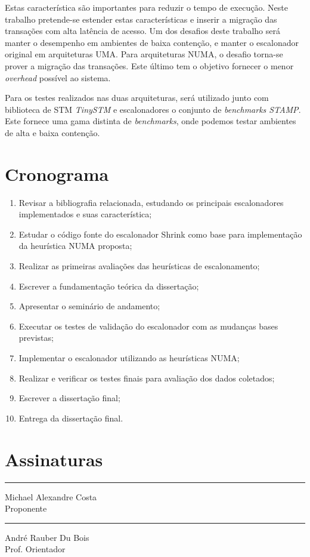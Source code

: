 \documentclass[diss-proposta,nocipinfo]{texufpel}
\begin{document}
Estas característica são importantes para reduzir o tempo de execução. Neste trabalho pretende-se estender estas características e inserir a migração das transações com alta latência de acesso. Um dos desafios deste trabalho será manter o desempenho em ambientes de baixa contenção, e manter o escalonador original em arquiteturas UMA. Para arquiteturas NUMA, o desafio torna-se prover a migração das transações. Este último tem o objetivo fornecer o menor \emph{overhead} possível ao sistema.

Para os testes realizados nas duas arquiteturas, será utilizado junto com biblioteca de STM \emph{TinySTM} e escalonadores o conjunto de \emph{benchmarks STAMP}. Este fornece uma gama distinta de \emph{benchmarks}, onde podemos testar ambientes de alta e baixa contenção.


\chapter{Cronograma}

\begin{enumerate}
  \item Revisar a bibliografia relacionada, estudando os principais escalonadores implementados e suas característica;
  \item Estudar o código fonte do escalonador Shrink como base para implementação da heurística NUMA proposta;
  \item Realizar as primeiras avaliações das heurísticas de escalonamento;
  \item Escrever a fundamentação teórica da dissertação;
  \item Apresentar o seminário de andamento;
  \item Executar os testes de validação do escalonador com as mudanças bases previstas;
  \item Implementar o escalonador utilizando as heurísticas NUMA;
  \item Realizar e verificar os testes finais para avaliação dos dados coletados;
  \item Escrever a dissertação final;
  \item Entrega da dissertação final.
\end{enumerate}






\chapter{Assinaturas}
\vspace{2cm}

\begin{center}
\rule{8cm}{.3mm}
\medskip

	Michael Alexandre Costa\\
	Proponente

\end{center}

\vspace{4cm}

\begin{center}
\rule{8cm}{.3mm}
\medskip

	André Rauber Du Bois\\
	Prof. Orientador

\end{center}
\end{document}
